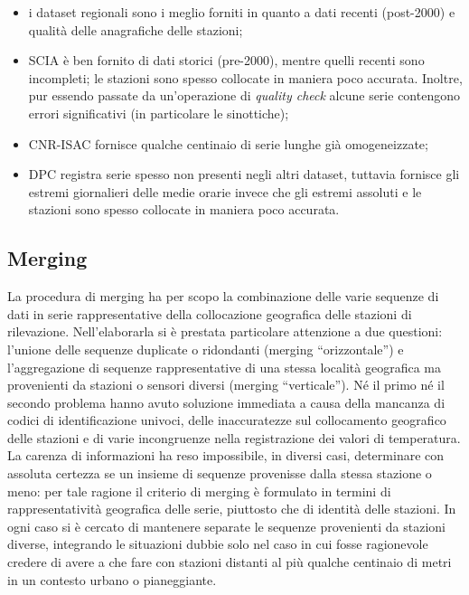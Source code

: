 \begin{itemize}
  \item
    i dataset regionali sono i meglio forniti in quanto a dati recenti (post-2000) e qualità delle anagrafiche delle stazioni;
  \item
    SCIA è ben fornito di dati storici (pre-2000), mentre quelli recenti sono incompleti; le stazioni sono spesso collocate in maniera poco accurata. Inoltre, pur essendo passate da un'operazione di \emph{quality check} alcune serie contengono errori significativi (in particolare le sinottiche);
  \item
    CNR-ISAC fornisce qualche centinaio di serie lunghe già omogeneizzate;
  \item
    DPC registra serie spesso non presenti negli altri dataset, tuttavia fornisce gli estremi giornalieri delle medie orarie invece che gli estremi assoluti e le stazioni sono spesso collocate in maniera poco accurata.
\end{itemize}

\subsection{Merging}\label{ch:merging}
La procedura di merging ha per scopo la combinazione delle varie sequenze di dati in serie rappresentative della collocazione geografica delle stazioni di rilevazione. Nell'elaborarla si è prestata particolare attenzione a due questioni: l'unione delle sequenze duplicate o ridondanti (merging ``orizzontale'') e l'aggregazione di sequenze rappresentative di una stessa località geografica ma provenienti da stazioni o sensori diversi (merging ``verticale''). Né il primo né il secondo problema hanno avuto soluzione immediata a causa della mancanza di codici di identificazione univoci, delle inaccuratezze sul collocamento geografico delle stazioni e di varie incongruenze nella registrazione dei valori di temperatura. La carenza di informazioni ha reso impossibile, in diversi casi, determinare con assoluta certezza se un insieme di sequenze provenisse dalla stessa stazione o meno: per tale ragione il criterio di merging è formulato in termini di rappresentatività geografica delle serie, piuttosto che di identità delle stazioni. In ogni caso si è cercato di mantenere separate le sequenze provenienti da stazioni diverse, integrando le situazioni dubbie solo nel caso in cui fosse ragionevole credere di avere a che fare con stazioni distanti al più qualche centinaio di metri in un contesto urbano o pianeggiante.

